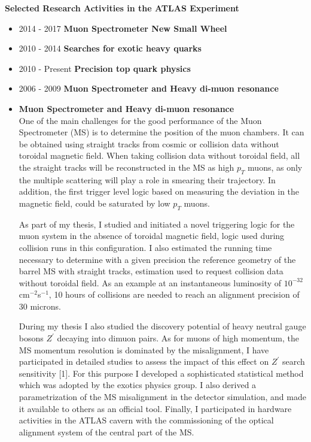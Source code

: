 \documentclass[12pt]{article}
\begin{document}
{\bf \large Selected Research Activities in the ATLAS Experiment}
\vskip 0.2cm
\begin{itemize}[leftmargin=1.3cm]
\itemsep0.8em

 \item[] 2014 - 2017 {\bf Muon Spectrometer New Small Wheel}\\
 \item[] 2010 - 2014 {\bf Searches for exotic heavy quarks}\\
 \item[] 2010 - Present {\bf Precision top quark physics}\\
 \item[] 2006 - 2009 {\bf Muon Spectrometer and Heavy di-muon resonance}\\


 \item[] {\bf Muon Spectrometer and Heavy di-muon resonance}\\
One of the main challenges for the good performance of the Muon Spectrometer (MS) is to determine the position of the muon chambers. 
It can be obtained using straight tracks from cosmic or collision data without toroidal magnetic field. 
When taking collision data without toroidal field, all the straight tracks will be reconstructed in the MS as high $p_T$ muons, as only the multiple 
scattering will play a role in smearing their trajectory. In addition, the first trigger level logic based on measuring the deviation in the magnetic field,
could be saturated by low $p_T$ muons.
\vspace{2.5mm}

As part of my thesis, I studied and initiated a novel triggering logic for the muon system in the absence of toroidal magnetic field, logic used during 
collision runs in this configuration. I also estimated the running time necessary to determine with a given precision the reference geometry 
of the barrel MS with straight tracks, estimation used to request collision data without toroidal field. 
As an example at an instantaneous luminosity of $10^{-32}$ cm$^{-2}$s$^{-1}$, 10 hours of collisions are needed to reach an alignment precision of 30 microns. 
\vspace{2.5mm}

 
During my thesis I also studied the discovery potential of heavy neutral gauge bosons $Z^{\prime}$ decaying into dimuon pairs. 
As for muons of high momentum, the MS momentum resolution is dominated by the misalignment, I have participated in detailed studies to assess the impact of this effect on $Z^{\prime}$ 
search sensitivity [1]. For this purpose I developed a sophisticated statistical method which was adopted by the exotics physics group. I also derived a parametrization of the MS misalignment 
in the detector simulation, and made it available to others as an official tool.
Finally, I participated in hardware activities in the ATLAS cavern with the 
commissioning of the optical alignment system of the central part of the MS.



\end{itemize}
\end{document}
